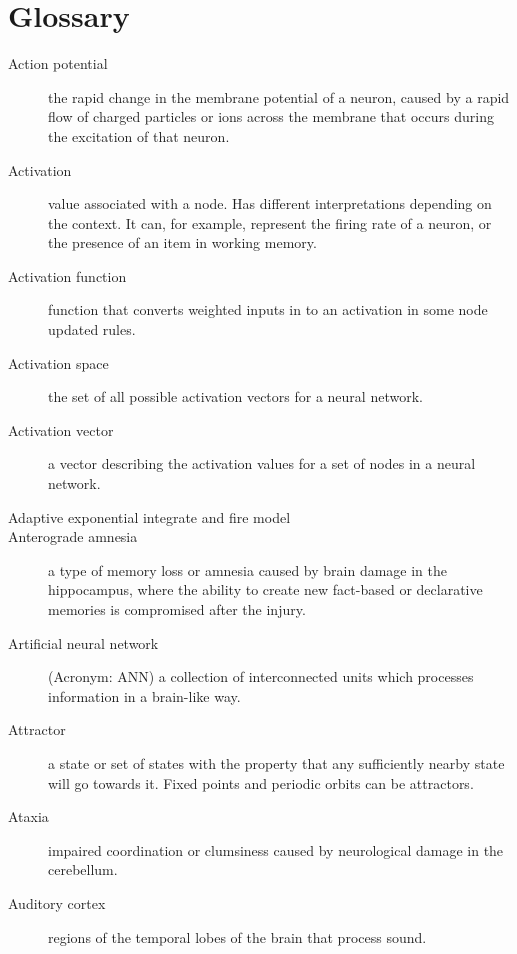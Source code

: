 \chapter{Glossary}

\begin{description}

\item[Action potential] the rapid change in the membrane potential of a neuron, caused by a rapid flow of charged particles or ions across the membrane that occurs during the excitation of that neuron.

\item[Activation] value associated with a node. Has different interpretations depending on the context. It can, for example, represent the firing rate of a neuron, or the presence of an item in working memory.

\item[Activation function] function that converts weighted inputs in to an activation in some node updated rules.

\item[Activation space] the set of all possible activation vectors for a neural network.

\item[Activation vector] a vector describing the activation values for a set of nodes in a neural network.

\item[Adaptive exponential integrate and fire model]

\item[Anterograde amnesia] a type of memory loss or amnesia caused by brain damage in the hippocampus, where the ability to create new fact-based or declarative memories is compromised after the injury. 

\item[Artificial neural network] (Acronym: ANN) a collection of interconnected units which processes information in a brain-like way.

\item[Attractor] a state or set of states with the property that any  sufficiently nearby state will go towards it. Fixed points and periodic orbits can be attractors.

\item[Ataxia] impaired coordination or clumsiness caused by neurological damage in the cerebellum.

\item[Auditory cortex] regions of the temporal lobes of the brain that process sound. 


\end{description}
